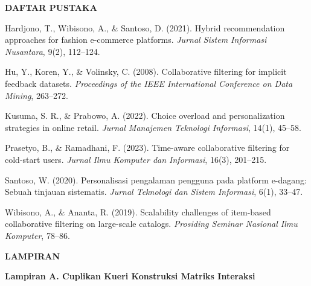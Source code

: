 \documentclass[12pt,a4paper]{report}
\begin{document}
\newpage
\begin{center}
{\bfseries\color{uinavy}\large DAFTAR PUSTAKA}
\end{center}
\vspace{0.4cm}
\begin{singlespace}
\begin{flushleft}
\setlength{\parindent}{0pt}
\setlength{\parskip}{8pt}

Hardjono, T., Wibisono, A., \& Santoso, D. (2021). Hybrid recommendation
approaches for fashion e-commerce platforms. \emph{Jurnal Sistem Informasi
Nusantara}, 9(2), 112--124.

Hu, Y., Koren, Y., \& Volinsky, C. (2008). Collaborative filtering for
implicit feedback datasets. \emph{Proceedings of the IEEE International
Conference on Data Mining}, 263--272.

Kusuma, S. R., \& Prabowo, A. (2022). Choice overload and personalization
strategies in online retail. \emph{Jurnal Manajemen Teknologi Informasi},
14(1), 45--58.

Prasetyo, B., \& Ramadhani, F. (2023). Time-aware collaborative filtering
for cold-start users. \emph{Jurnal Ilmu Komputer dan Informasi}, 16(3),
201--215.

Santoso, W. (2020). Personalisasi pengalaman pengguna pada platform
e-dagang: Sebuah tinjauan sistematis. \emph{Jurnal Teknologi dan Sistem
Informasi}, 6(1), 33--47.

Wibisono, A., \& Ananta, R. (2019). Scalability challenges of item-based
collaborative filtering on large-scale catalogs. \emph{Prosiding Seminar
Nasional Ilmu Komputer}, 78--86.

\end{flushleft}
\end{singlespace}

\newpage
\begin{center}
{\bfseries\color{uinavy}\large LAMPIRAN}
\end{center}
\vspace{0.4cm}

\noindent
\textbf{Lampiran A. Cuplikan Kueri Konstruksi Matriks Interaksi}
\end{document}
